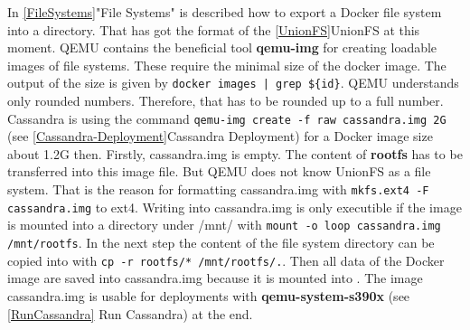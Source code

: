 In \ref{FileSystems}"File Systems" is described how to export a Docker file system into a directory. That has got the format of the \ref{UnionFS}UnionFS at this moment. QEMU contains the beneficial tool \textbf{qemu-img} for creating loadable images of file systems. These require the minimal size of the docker image. The output of the size is given by \lstinline!docker images | grep ${id}!. QEMU understands only rounded numbers. Therefore, that has to be rounded up to a full number. Cassandra is using the command \lstinline!qemu-img create -f raw cassandra.img 2G! (see \ref{Cassandra-Deployment}Cassandra Deployment) for a Docker image size about 1.2G then. Firstly, cassandra.img is empty. The content of \textbf{rootfs} has to be transferred into this image file. But QEMU does not know UnionFS as a file system. That is the reason for formatting cassandra.img with \lstinline!mkfs.ext4 -F cassandra.img! to ext4. Writing into cassandra.img is only executible if the image is mounted into a directory under /mnt/ with \lstinline!mount -o loop cassandra.img /mnt/rootfs!. In the next step the content of the file system directory can be copied into  with \lstinline!cp -r rootfs/* /mnt/rootfs/.!. Then all data of the Docker image are saved into cassandra.img because it is mounted into . The image cassandra.img is usable for deployments with \textbf{qemu-system-s390x} (see \ref{RunCassandra} Run Cassandra) at the end. 